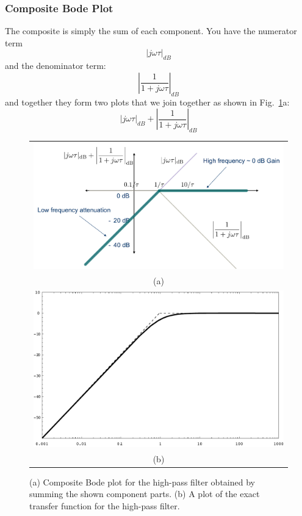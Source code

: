 
\subsubsection{Composite Bode Plot}

The composite is simply the sum of each component.  You have the numerator term
\begin{equation}
	{\left| {j\omega \tau } \right|_{dB}}
\end{equation}
and the denominator term:
\begin{equation}
	{\left| {\frac{1}{{1 + j\omega \tau }}} \right|_{dB}}
\end{equation}
and together they form two plots that we join together as shown in Fig.~\ref{fig:bode}a:
\begin{equation}
	{\left| {j\omega \tau } \right|_{dB}} + {\left| {\frac{1}{{1 + j\omega \tau }}} \right|_{dB}}
\end{equation}


\begin{figure}[tb]
\begin{center}
\begin{tabular}{c}
\includegraphics[width=.75\columnwidth]{mod1_3_11_bode3} \\
(a) \\
\includegraphics[angle=-0.0,width=.75\columnwidth]{mag_hpf} \\
(b) \\
\end{tabular}
\end{center}
\caption{(a) Composite Bode plot for the high-pass filter obtained by summing the shown component parts.  (b) A plot of the exact transfer function for the high-pass filter.} \label{fig:bode}
\end{figure}

